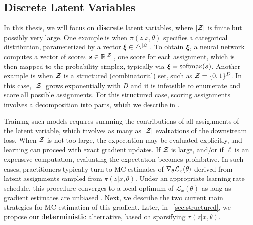 \subsection{Discrete Latent Variables}\label{sec:discrete_lvm_bg}

\noindent In this thesis, we will focus on \textbf{discrete} latent variables, where
$|\mathcal{Z}|$ is finite but possibly very large. One example is when
$\pi(z|x,\theta)$ specifies a categorical distribution, parameterized by a
vector $\bm{\xi} \in \triangle^{|\mathcal{Z}|}$. To obtain $\bm{\xi}$, a neural network
computes a vector of scores $\bm{s} \in \mathbb{R}^{|\mathcal{Z}|}$, one score
for each assignment, which is then mapped to the probability simplex,
typically via $\bm{\xi} = \operatorname*{\mathsf{softmax}}(\bm{s})$. Another example is when $\mathcal{Z}$ is
a structured (combinatorial) set, such as $\mathcal{Z} = \{0, 1\}^D$. In this
case, $|\mathcal{Z}|$ grows exponentially with $D$ and it is infeasible to
enumerate and score all possible assignments. For this structured
case, scoring assignments involves a decomposition into parts, which
we describe in .

Training such models requires summing the contributions of all
assignments of the latent variable, which involves as many as $|\mathcal{Z}|$
evaluations of the downstream loss. When $\mathcal{Z}$ is not too large, the
expectation may be evaluated explicitly, and learning can proceed
with exact gradient updates. If $\mathcal{Z}$ is large, and/or if $\ell$ is
an expensive computation, evaluating the expectation becomes
prohibitive. In such cases, practitioners typically turn to MC
estimates of $\nabla_\theta \mathcal{L}_x(\theta)$ derived from latent
assignments sampled from $\pi(z|x,\theta)$. Under an appropriate
learning rate schedule, this procedure converges to a local optimum
of $\mathcal L_x(\theta)$ as long as gradient estimates are unbiased
\citep{robbins1951stochastic}. Next, we describe the two current main
strategies for MC estimation of this gradient. Later, in
--\ref{sec:structured}, we propose our
\textbf{deterministic} alternative, based on sparsifying $\pi(z| x,
        \theta)$.

